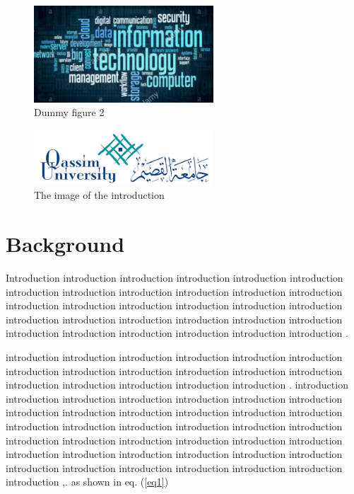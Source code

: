\begin{figure}[ht]
\begin{center}
\includegraphics[width=0.6\textwidth]{figures/samples/it.png}
\caption{Dummy figure 2}
\label{fig1}
\end{center}
\end{figure}

\begin{figure}
\begin{center}
\includegraphics[width=0.6\textwidth]{figures/samples/qu.png}
\caption{The image of the introduction}
\label{fig2}
\end{center}
\end{figure}

\hfill \break
\hfill \break
\hfill \break
\hfill \break
\hfill \break
\hfill \break
\hfill \break
\hfill \break
\hfill \break
\hfill \break
\hfill \break
\hfill \break
\hfill \break
\hfill \break
\hfill \break
\hfill \break
\hfill \break

\section{Background}
Introduction introduction introduction introduction introduction introduction introduction introduction introduction introduction introduction introduction introduction introduction introduction introduction introduction introduction introduction introduction introduction introduction introduction introduction introduction introduction introduction introduction introduction introduction \cite{ref1}. 
      

introduction introduction introduction introduction introduction introduction introduction introduction introduction introduction introduction introduction introduction introduction introduction introduction introduction \cite{ref2}. introduction introduction introduction introduction introduction introduction introduction introduction introduction introduction introduction introduction introduction introduction introduction introduction introduction introduction introduction introduction introduction introduction introduction introduction introduction introduction introduction introduction introduction introduction introduction introduction introduction introduction introduction introduction introduction introduction 
\cite{ref5},\cite{ref6}. as shown in eq. (\ref{eq1})


